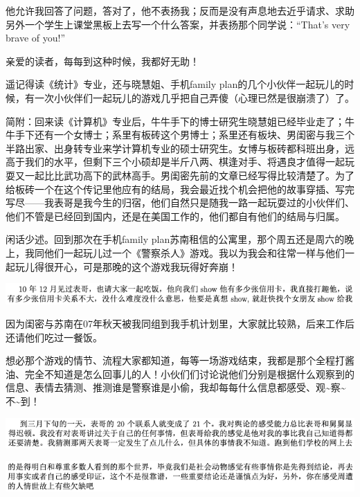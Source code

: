 \documentclass[9pt, b5paper]{article}
\begin{document}
他允许我回答了问题，答对了，他不表扬我；反而是没有声息地去近乎请求、求助另外一个学生上课堂黑板上去写一个什么答案，并表扬那个同学说：“That's very brave of you!”

亲爱的读者，每每到这种时候，我都好无助！

遥记得读《统计》专业，还与晓慧姐、手机family plan的几个小伙伴一起玩儿的时候，有一次小伙伴们一起玩儿的游戏几乎把自己弄傻（心理已然是很崩溃了）了。

简附：回来读《计算机》专业后，牛牛手下的博士研究生晓慧姐已经毕业走了；牛牛手下还有一个女博士；系里有板砖这个男博士；系里还有板块、男闺密与我三个半路出家、出身转专业来学计算机专业的硕士研究生。女博与板砖都科班出身，远高于我们的水平，但剩下三个小硕却是半斤八两、棋逢对手、将遇良才值得一起玩耍又一起比比武功高下的武林高手。男闺密先前的文章已经写得比较清楚了。为了给板砖一个在这个传记里他应有的结局，我会最近找个机会把他的故事穿插、写完写尽——我表哥是我今生的归宿，他们自然只是随我一路一起玩耍过的小伙伴们、他们不管是已经回到国内，还是在美国工作的，他们都自有他们的结局与归属。 

闲话少述。回到那次在手机family plan苏南租信的公寓里，那个周五还是周六的晚上，我同他们一起玩儿过一个《警察杀人》游戏。我以为我会和往常一样与他们一起玩儿得很开心，可是那晚的这个游戏我玩得好奔崩！

\begin{center}
\includegraphics[width=.9\linewidth]{./pic/backups_plans_20210425_152933.png}
\end{center}

因为闺密与苏南在07年秋天被我同组到我手机计划里，大家就比较熟，后来工作后还请他们吃过一餐饭。

想必那个游戏的情节、流程大家都知道，每等一场游戏结束，我都是那个全程打酱油、完全不知道是怎么回事儿的人！小伙们们讨论说他们分别是根据什么观察到的信息、表情去猜测、推测谁是警察谁是小偷，我却每每什么信息都感受、观\textasciitilde{}察\textasciitilde{}不\textasciitilde{}到！

\begin{center}
\includegraphics[width=.9\linewidth]{./pic/backups_plans_20210425_153712.png}
\end{center}

\begin{center}
\includegraphics[width=.9\linewidth]{./pic/backups_plans_20210425_153639.png}
\end{center}
\end{document}
